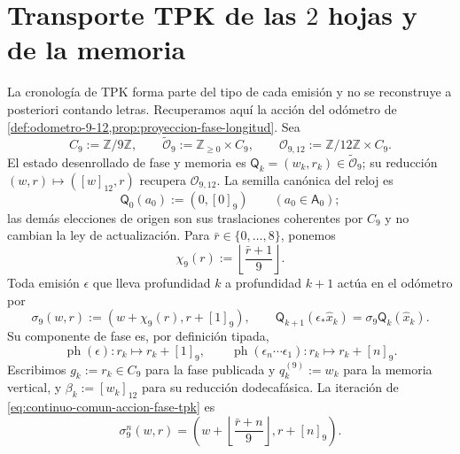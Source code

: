 \section{Transporte TPK de las \(2\) hojas y de la memoria}
\label{sec:continuo-comun-tpk-transporte}

La cronolog\'ia de TPK forma parte del tipo de cada emisi\'on y no se
reconstruye a posteriori contando letras. Recuperamos aqu\'i la acci\'on del
od\'ometro de \cref{def:odometro-9-12,prop:proyeccion-fase-longitud}. Sea
\begin{equation}
\label{eq:continuo-comun-ciclo-fase-tpk}
 C_9:=\mathbb Z/9\mathbb Z,\qquad
 \widetilde{\mathcal O}_{9}:=\mathbb Z_{\geq0}\times C_9,\qquad
 \mathcal O_{9,12}:=\mathbb Z/12\mathbb Z\times C_9.
\end{equation}
El estado desenrollado de fase y memoria es
\(\mathsf Q_k=(w_k,r_k)\in\widetilde{\mathcal O}_{9}\); su reducción
\((w,r)\mapsto([w]_{12},r)\) recupera
\(\mathcal O_{9,12}\). La semilla canónica del reloj es
\begin{equation}
\label{eq:continuo-comun-semilla-fase-tpk}
 \mathsf Q_0(a_0):=(0,[0]_9)\qquad(a_0\in\mathsf A_0);
\end{equation}
las demás elecciones de origen son sus traslaciones coherentes por \(C_9\)
y no cambian la ley de actualización. Para
\(\bar r\in\{0,\ldots,8\}\), ponemos
\begin{equation}
\label{eq:continuo-comun-carry-fase-tpk}
 \chi_9(r):=\left\lfloor\frac{\bar r+1}{9}\right\rfloor.
\end{equation}
Toda emisión \(\epsilon\) que lleva profundidad \(k\) a profundidad \(k+1\)
actúa en el odómetro por
\begin{equation}
\label{eq:continuo-comun-accion-fase-tpk}
 \sigma_9(w,r):=(w+\chi_9(r),r+[1]_9),\qquad
 \mathsf Q_{k+1}(\epsilon_*\widehat x_k)
 =\sigma_9\mathsf Q_k(\widehat x_k).
\end{equation}
Su componente de fase es, por definición tipada,
\begin{equation}
\label{eq:continuo-comun-fase-emision-tpk}
 \operatorname{ph}(\epsilon):r_k\longmapsto r_k+[1]_9,
 \qquad
 \operatorname{ph}(\epsilon_n\cdots\epsilon_1):
 r_k\longmapsto r_k+[n]_9.
\end{equation}
Escribimos \(g_k:=r_k\in C_9\) para la fase publicada y
\(q^{(9)}_k:=w_k\) para la memoria vertical, y
\(\beta_k:=[w_k]_{12}\) para su reducción dodecafásica. La iteración de
\eqref{eq:continuo-comun-accion-fase-tpk} es
\begin{equation}
\label{eq:continuo-comun-iteracion-fase-tpk}
 \sigma_9^n(w,r)=
 \left(w+\left\lfloor\frac{\bar r+n}{9}\right\rfloor,
       r+[n]_9\right).
\end{equation}
